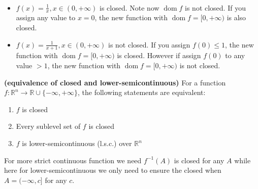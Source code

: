 \documentclass{article}
\newcommand{\bfs}[1]{\textbf{({#1}) }}
\newcommand{\dom}{\operatorname{dom}}
\begin{document}
\begin{exma}$\quad$

   \begin{itemize}
       \item $f(x)=\frac{1}{x}, x\in (0,+\infty)$ is closed. Note now $\dom f$ is not closed. If you assign any value to $x=0$, the new function with $\dom f=[0,+\infty)$ is also closed.
       \item $f(x)=\frac{1}{x+1}, x\in (0,+\infty)$ is not closed. If you assign $f(0)\le 1$, the new function with $\dom f=[0,+\infty)$ is closed. However if  assign $f(0)$ to any value $>1$, the new function with $\dom f=[0,+\infty)$ is not closed. 
   \end{itemize}
\end{exma}
\begin{thma}{\bfs{equivalence of closed and lower-semicontinuous}}\label{thm:eq_cl_cl}
For a function $f: \mathbb{R}^{n} \rightarrow \mathbb{R} \cup\{-\infty,+\infty\}$, the following statements are equivalent:
\begin{enumerate}
    \item $f$ is closed
    \item Every sublevel set of $f$ is closed
    \item $f$ is lower-semicontinuous (l.s.c.) over $\mathbb{R}^{n}$
\end{enumerate}
\end{thma}
\begin{rema}
For more strict continuous function we need $f^{-1}(A)$ is closed for any $A$ while here for  lower-semicontinuous we only need to ensure the closed when $A=(-\infty,c]$ for any $c$.
\end{rema}
\end{document}
